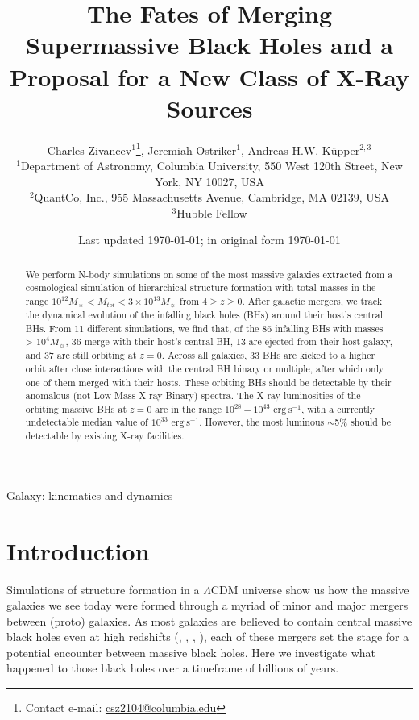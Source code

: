 \documentclass[fleqn,usenatbib,useAMS]{mnras}
\title[MNRAS]{The Fates of Merging Supermassive Black Holes and a Proposal for a New Class of X-Ray Sources}
\author[]{
Charles Zivancev$^{1}$\thanks{Contact e-mail: \href{mailto:csz2104@columbia.edu}{csz2104@columbia.edu}},
Jeremiah Ostriker$^{1}$,
Andreas H.W. K\"upper$^{2,3}$
\\
$^{1}$Department of Astronomy, Columbia University, 550 West 120th Street, New York, NY 10027, USA\\
$^{2}$QuantCo, Inc., 955 Massachusetts Avenue, Cambridge, MA 02139, USA\\
$^{3}$Hubble Fellow\\
}
\date{Last updated \today; in original form \today}
\begin{document}
\label{firstpage}
\pagerange{\pageref{firstpage}--\pageref{lastpage}}
\maketitle



\begin{abstract}
We perform N-body simulations on some of the most massive galaxies extracted from a cosmological simulation of hierarchical structure formation with total masses in the range $10^{12} M_{\sun} < M_{tot} < 3\times 10^{13} M_{\sun}$ from $4\geq z \geq 0$.  After galactic mergers, we track the dynamical evolution of the infalling black holes (BHs) around their host's central BHs.  From 11 different simulations, we find that, of the 86 infalling BHs with masses > $10^4 M_{\sun}$, 36 merge with their host's central BH, 13 are ejected from their host galaxy, and 37 are still orbiting at $z=0$.  Across all galaxies, 33 BHs are kicked to a higher orbit after close interactions with the central BH binary or multiple, after which only one of them merged with their hosts.  These orbiting BHs should be detectable by their anomalous (not Low Mass X-ray Binary) spectra.  The X-ray luminosities of the orbiting massive BHs at $z=0$ are in the range $10^{28}-10^{43}$ $\mathrm{erg}~\mathrm{s}^{-1}$, with a currently undetectable median value of $10^{33}$ $\mathrm{erg}~\mathrm{s}^{-1}$.  However, the most luminous $\sim$5\% should be detectable by existing X-ray facilities.
\end{abstract}


\begin{keywords}
Galaxy: kinematics and dynamics
\end{keywords}




\section{Introduction}\label{sec:introduction}
Simulations of structure formation in a $\Lambda$CDM universe show us how the massive galaxies we see today were formed through a myriad of minor and major mergers between (proto) galaxies. As most galaxies are believed to contain central massive black holes even at high redshifts (\citet{1998AJ....115.2285M}, \citet{2003ApJ...589L..21M}, \citet{2004ApJ...604L..89H}, \citet{2013ARA&A..51..511K}), each of these mergers set the stage for a potential encounter between massive black holes. Here we investigate what happened to those black holes over a timeframe of billions of years.
\end{document}
